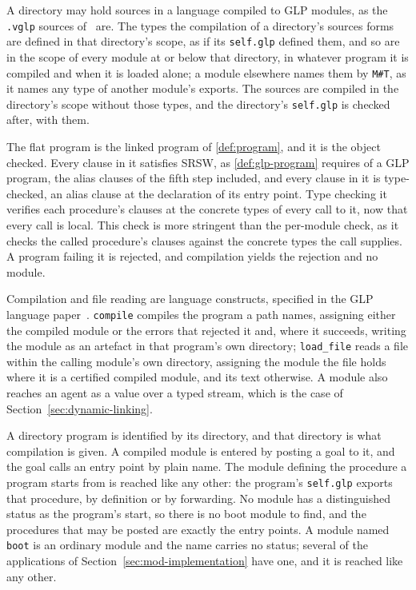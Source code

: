 A directory may hold sources in a language compiled to GLP modules, as the \verb|.vglp| sources of~\cite{shapiro2026volition} are.  The types the compilation of a directory's sources forms are defined in that directory's scope, as if its \verb|self.glp| defined them, and so are in the scope of every module at or below that directory, in whatever program it is compiled and when it is loaded alone; a module elsewhere names them by \verb|M#T|, as it names any type of another module's exports.  The sources are compiled in the directory's scope without those types, and the directory's \verb|self.glp| is checked after, with them.

The flat program is the linked program of \cref{def:program}, and it is the object checked.  Every clause in it satisfies SRSW, as \cref{def:glp-program} requires of a GLP program, the alias clauses of the fifth step included, and every clause in it is type-checked, an alias clause at the declaration of its entry point.  Type checking it verifies each procedure's clauses at the concrete types of every call to it, now that every call is local.  This check is more stringent than the per-module check, as it checks the called procedure's clauses against the concrete types the call supplies.  A program failing it is rejected, and compilation yields the rejection and no module.

Compilation and file reading are language constructs, specified in the GLP language paper~\cite{shapiro2025glp}.  \verb|compile| compiles the program a path names, assigning either the compiled module or the errors that rejected it and, where it succeeds, writing the module as an artefact in that program's own directory; \verb|load_file| reads a file within the calling module's own directory, assigning the module the file holds where it is a certified compiled module, and its text otherwise.  A module also reaches an agent as a value over a typed stream, which is the case of Section~\ref{sec:dynamic-linking}.

A directory program is identified by its directory, and that directory is what compilation is given.
A compiled module is entered by posting a goal to it, and the goal calls an entry point by plain
name.  The module defining the procedure a program starts from is reached like any other: the
program's \verb|self.glp| exports that procedure, by definition or by forwarding.  No module has a
distinguished status as the program's start, so there is no boot module to find, and the procedures
that may be posted are exactly the entry points.  A module named \verb|boot| is an ordinary module
and the name carries no status; several of the applications of
Section~\ref{sec:mod-implementation} have one, and it is reached like any other.

